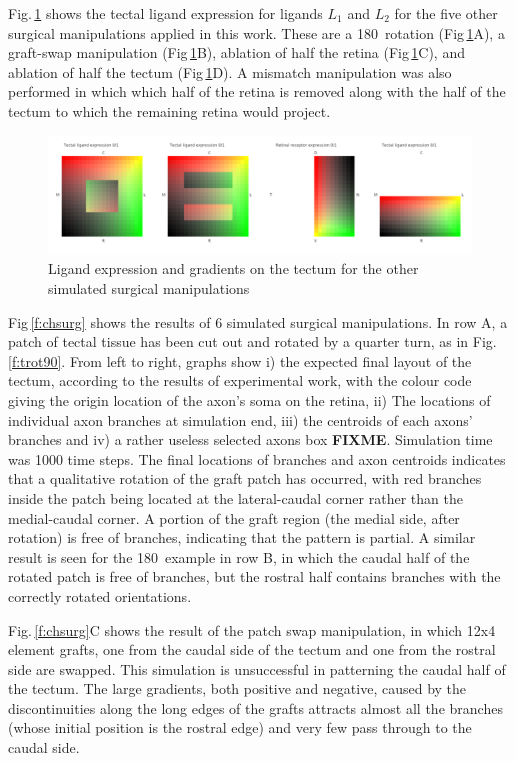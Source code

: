 \documentclass[11pt, a4paper]{article}
\begin{document}
Fig.\,\ref{f:tmanip} shows the tectal ligand expression for ligands $L_1$ and
$L_2$ for the five other surgical manipulations applied in this work. These
are a 180\degree~rotation (Fig\,\ref{f:tmanip}A), a graft-swap manipulation
(Fig\,\ref{f:tmanip}B), ablation of half the retina (Fig\,\ref{f:tmanip}C),
and ablation of half the tectum (Fig\,\ref{f:tmanip}D). A mismatch
manipulation was also performed in which which half of the retina is removed
along with the half of the tectum to which the remaining retina would project.

\begin{figure}
\includegraphics[width=\linewidth]{./images/expressions_manipulations.png}
\caption{Ligand expression and gradients on the tectum for the
other simulated surgical manipulations}
\label{f:tmanip}
\end{figure}

Fig\,\ref{f:chsurg} shows the results of 6 simulated surgical
manipulations. In row A, a patch of tectal tissue has been cut out and rotated
by a quarter turn, as in Fig.\,\ref{f:trot90}. From left to right, graphs show
i) the expected final layout of the tectum, according to the results of
experimental work, with the colour code giving the origin location of the
axon's soma on the retina, ii) The locations of individual axon branches at
simulation end, iii) the centroids of each axons' branches and iv) a rather
useless selected axons box \textbf{FIXME}. Simulation time was 1000 time steps. The final
locations of branches and axon centroids indicates that a qualitative rotation
of the graft patch has occurred, with red branches inside the patch being
located at the lateral-caudal corner rather than the medial-caudal corner. A
portion of the graft region (the medial side, after rotation) is free of
branches, indicating that the pattern is partial. A similar result is seen for
the 180\degree~example in row B, in which the caudal half of the rotated patch
is free of branches, but the rostral half contains branches with the correctly
rotated orientations.

Fig.\,\ref{f:chsurg}C shows the result of the patch swap manipulation, in
which 12x4 element grafts, one from the caudal side of the tectum and one from
the rostral side are swapped. This simulation is unsuccessful in patterning
the caudal half of the tectum. The large gradients, both positive and
negative, caused by the discontinuities along the long edges of the grafts
attracts almost all the branches (whose initial position is the rostral edge)
and very few pass through to the caudal side.
\end{document}
